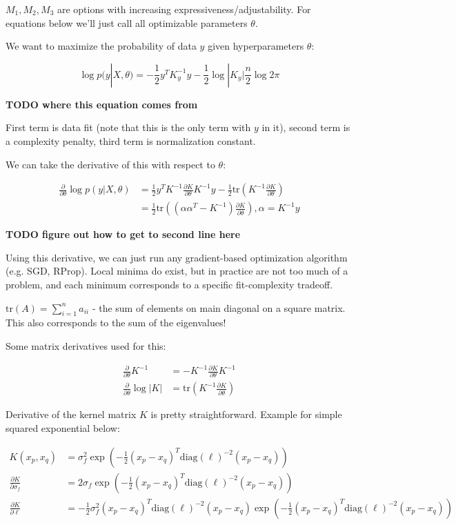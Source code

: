 \documentclass[a4paper]{article}
\begin{document}
$M_1, M_2, M_3$ are options with increasing expressiveness/adjustability. For equations below we'll just call all optimizable parameters $\theta$. 

We want to maximize the probability of data $y$ given hyperparameters $\theta$: 

$$ \log p(y | X, \theta) = -\frac{1}{2} y^T K_y ^{-1} y - \frac{1}{2} \log |K_y| \frac{n}{2} \log 2\pi$$

\textbf{TODO where this equation comes from}

First term is data fit (note that this is the only term with $y$ in it), second term is a complexity penalty, third term is normalization constant. 

We can take the derivative of this with respect to $\theta$: 

\begin{align*}
\frac{\partial}{\partial \theta} \log p(y | X, \theta) &= \frac{1}{2} y^T K^{-1} \frac{\partial K}{\partial \theta} K^{-1}y - \frac{1}{2} \text{tr}(K^{-1} \frac{\partial K}{\partial \theta}) \\
&= \frac{1}{2} \text{tr}\left( (\alpha \alpha^T - K^{-1})  \frac{\partial K}{\partial \theta} \right), \alpha = K^{-1}y
\end{align*}

\textbf{TODO figure out how to get to second line here}

Using this derivative, we can just run any gradient-based optimization algorithm (e.g. SGD, RProp). Local minima do exist, but in practice are not too much of a problem, and each minimum corresponds to a specific fit-complexity tradeoff.

$\text{tr}(A)=\sum_{i=1}^n a_{ii}$ - the sum of elements on main diagonal on a square matrix. This also corresponds to the sum of the eigenvalues!

Some matrix derivatives used for this: 

\begin{align*}
\frac{\partial}{\partial \theta} K^{-1} &= -K^{-1} \frac{\partial K}{\partial \theta} K^{-1} \\
\frac{\partial}{\partial \theta} \log |K| &= \text{tr}(K^{-1} \frac{\partial K}{\partial \theta})
\end{align*}

Derivative of the kernel matrix $K$ is pretty straightforward. Example for simple squared exponential below: 

\begin{align*}
K(x_p, x_q) &= \sigma_f^2 \exp(-\frac{1}{2} (x_p - x_q)^T \text{diag}(\mathbf{\ell})^{-2} (x_p - x_q) ) \\
\frac{\partial K}{\partial \sigma_f} &= 2 \sigma_f \exp\left(-\frac{1}{2} (x_p - x_q)^T \text{diag}(\mathbf{\ell})^{-2} (x_p - x_q) \right) \\
\frac{\partial K}{\partial \ell} &= - \frac{1}{2} \sigma_f^2 (x_p - x_q)^T \text{diag}(\mathbf{\ell})^{-2} (x_p - x_q) \exp\left(-\frac{1}{2} (x_p - x_q)^T \text{diag}(\mathbf{\ell})^{-2} (x_p - x_q) \right)
\end{align*}
\end{document}
